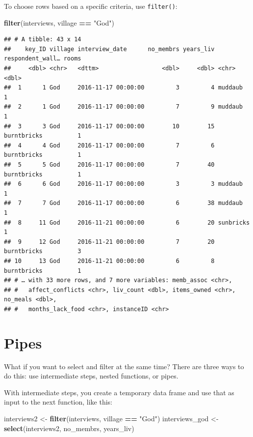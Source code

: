 \documentclass[]{book}
\newenvironment{Shaded}{\begin{snugshade}}{\end{snugshade}}
\newcommand{\KeywordTok}[1]{\textcolor[rgb]{0.13,0.29,0.53}{\textbf{#1}}}
\newcommand{\StringTok}[1]{\textcolor[rgb]{0.31,0.60,0.02}{#1}}
\newcommand{\OperatorTok}[1]{\textcolor[rgb]{0.81,0.36,0.00}{\textbf{#1}}}
\newcommand{\NormalTok}[1]{#1}
\begin{document}
To choose rows based on a specific criteria, use \texttt{filter()}:

\begin{Shaded}
\begin{Highlighting}[]
\KeywordTok{filter}\NormalTok{(interviews, village }\OperatorTok{==}\StringTok{ "God"}\NormalTok{)}
\end{Highlighting}
\end{Shaded}

\begin{verbatim}
## # A tibble: 43 x 14
##    key_ID village interview_date      no_membrs years_liv respondent_wall… rooms
##     <dbl> <chr>   <dttm>                  <dbl>     <dbl> <chr>            <dbl>
##  1      1 God     2016-11-17 00:00:00         3         4 muddaub              1
##  2      1 God     2016-11-17 00:00:00         7         9 muddaub              1
##  3      3 God     2016-11-17 00:00:00        10        15 burntbricks          1
##  4      4 God     2016-11-17 00:00:00         7         6 burntbricks          1
##  5      5 God     2016-11-17 00:00:00         7        40 burntbricks          1
##  6      6 God     2016-11-17 00:00:00         3         3 muddaub              1
##  7      7 God     2016-11-17 00:00:00         6        38 muddaub              1
##  8     11 God     2016-11-21 00:00:00         6        20 sunbricks            1
##  9     12 God     2016-11-21 00:00:00         7        20 burntbricks          3
## 10     13 God     2016-11-21 00:00:00         6         8 burntbricks          1
## # … with 33 more rows, and 7 more variables: memb_assoc <chr>,
## #   affect_conflicts <chr>, liv_count <dbl>, items_owned <chr>, no_meals <dbl>,
## #   months_lack_food <chr>, instanceID <chr>
\end{verbatim}

\section{Pipes}\label{pipes}

What if you want to select and filter at the same time? There are three
ways to do this: use intermediate steps, nested functions, or pipes.

With intermediate steps, you create a temporary data frame and use that
as input to the next function, like this:

\begin{Shaded}
\begin{Highlighting}[]
\NormalTok{interviews2 <-}\StringTok{ }\KeywordTok{filter}\NormalTok{(interviews, village }\OperatorTok{==}\StringTok{ "God"}\NormalTok{)}
\NormalTok{interviews_god <-}\StringTok{ }\KeywordTok{select}\NormalTok{(interviews2, no_membrs, years_liv)}
\end{Highlighting}
\end{Shaded}
\end{document}

